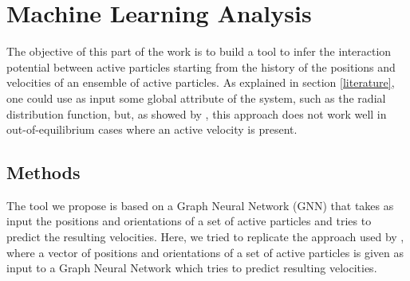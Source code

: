 \documentclass[../../master_thesis_np.tex]{subfiles}
\begin{document}
\chapter{Machine Learning Analysis}

The objective of this part of the work is to build a tool to infer the interaction potential between active particles starting from the {history} of the positions and velocities of an ensemble of active particles.
As explained in section \ref{literature}, one could use as input some global attribute of the system, such as the radial distribution function, but, as showed by \citeauthor{bag_interaction_2021}, this approach does not work well in out-of-equilibrium cases where an active velocity is present.

\section{Methods}
The tool we propose is based on a Graph Neural Network (GNN) that takes as input the positions and orientations of a set of active particles and tries to predict the resulting velocities.
Here, we tried to replicate the approach used by \citeauthor{ruiz-garcia_discovering_2024}, where a vector of positions and orientations of a set of active particles is given as input to a Graph Neural Network which tries to predict resulting velocities.
\end{document}
